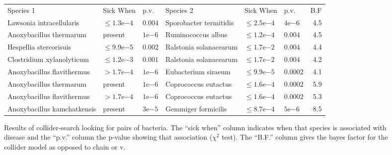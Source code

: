 \documentclass[letterpaper]{article}
\begin{document}
\begin{figure}[b]
  \begin{tabular}{llllllr}
Species 1 & Sick When & p.v. & Species 2 & Sick When & p.v. & B.F \\
    Lawsonia intracellularis & $\leq1.3\mathrm{e}{-4}$ & $0.004$ & Sporobacter termitidis & $\leq2.5\mathrm{e}{-4}$ & $4\mathrm{e}{-6}$ & 4.5 \\
Anoxybacillus thermarum & present & $1\mathrm{e}{-6}$ & Ruminococcus albus & $\leq1.2\mathrm{e}{-4}$ & $0.004$ & 4.5 \\
Hespellia stercorisuis & $\leq9.9\mathrm{e}{-5}$ & $0.002$ & Ralstonia solanacearum & $\leq1.7\mathrm{e}{-2}$ & $0.004$ & 4.4 \\
Clostridium xylanolyticum & $\leq1.2\mathrm{e}{-3}$ & $0.001$ & Ralstonia solanacearum & $\leq1.7\mathrm{e}{-2}$ & $0.004$ & 4.2 \\
Anoxybacillus flavithermus & $>1.7\mathrm{e}{-4}$ & $1\mathrm{e}{-6}$ & Eubacterium siraeum & $\leq9.9\mathrm{e}{-5}$ & $0.0002$ & 4.1 \\
Anoxybacillus thermarum & present & $1\mathrm{e}{-6}$ & Coprococcus eutactus & $\leq1.6\mathrm{e}{-4}$ & $0.0002$ & 5.9 \\
Anoxybacillus flavithermus & $>1.7\mathrm{e}{-4}$ & $1\mathrm{e}{-6}$ & Coprococcus eutactus & $\leq1.6\mathrm{e}{-4}$ & $0.0002$ & 5.3 \\
Anoxybacillus kamchatkensis & present & $3\mathrm{e}{-5}$ & Gemmiger formicilis & $\leq8.7\mathrm{e}{-4}$ & $5\mathrm{e}{-6}$ & 8.5 \\
  \end{tabular}
  \caption{Results of collider-search looking for pairs of bacteria.
    The ``sick when''  column indicates when that species is
    associated with disease and the ``p.v.'' column the p-value
    showing that association ($\chi^2$ test).  The ``B.F.'' column
    gives the bayes factor for the collider model as opposed to chain
    or v.}
  \label{two_bact_tab}
\end{figure}
\end{document}
